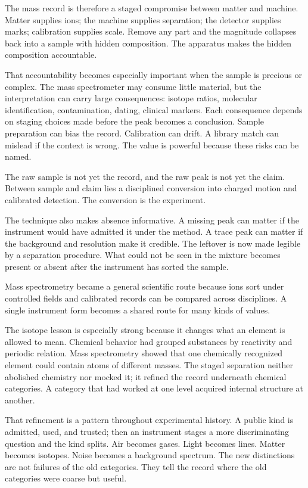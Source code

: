 The mass record is therefore a staged compromise between matter and
machine. Matter supplies ions; the machine supplies separation; the
detector supplies marks; calibration supplies scale. Remove any part and
the magnitude collapses back into a sample with hidden composition. The
apparatus makes the hidden composition accountable.

That accountability becomes especially important when the sample is
precious or complex. The mass spectrometer may consume little material, but
the interpretation can carry large consequences: isotope ratios, molecular
identification, contamination, dating, clinical markers. Each consequence
depends on staging choices made before the peak becomes a conclusion.
Sample preparation can bias the record. Calibration can drift. A library
match can mislead if the context is wrong. The value is powerful because
these risks can be named.

The raw sample is not yet the record, and the raw peak is not yet the
claim. Between sample and claim lies a disciplined conversion into charged
motion and calibrated detection. The conversion is the experiment.

The technique also makes absence informative. A missing peak can matter if
the instrument would have admitted it under the method. A trace peak can
matter if the background and resolution make it credible. The leftover is
now made legible by a separation procedure. What could not be seen in the
mixture becomes present or absent after the instrument has sorted the
sample.

Mass spectrometry became a general scientific route because ions sort under
controlled fields and calibrated records can be compared across disciplines.
A single instrument form becomes a shared route for many kinds of values.

The isotope lesson is especially strong because it changes what an element
is allowed to mean. Chemical behavior had grouped substances by reactivity
and periodic relation. Mass spectrometry showed that one chemically
recognized element could contain atoms of different masses. The staged
separation neither abolished chemistry nor mocked it; it refined the
record underneath chemical categories. A category that had worked at one
level acquired internal structure at another.

That refinement is a pattern throughout experimental history. A public
kind is admitted, used, and trusted; then an instrument stages a more
discriminating question and the kind splits. Air becomes gases. Light
becomes lines. Matter becomes isotopes. Noise becomes a background
spectrum. The new distinctions are not failures of the old categories.
They tell the record where the old categories were coarse but useful.

